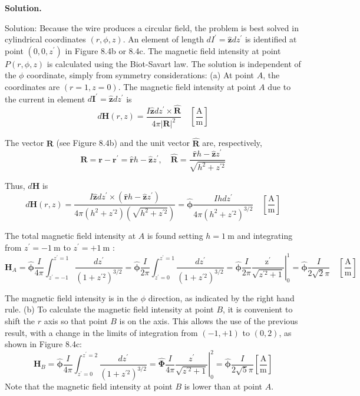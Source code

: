 \documentclass[12pt, a4paper, oneside]{report}
\newenvironment{solution}{
  \par\medskip\noindent
  \textbf{Solution.}\quad\itshape
  \par\noindent\makebox[\linewidth]{\rule{\textwidth}{0.4pt}}
}{
  \par\noindent\makebox[\linewidth]{\rule{\textwidth}{0.4pt}}
  \par\medskip
}
\begin{document}
\begin{solution}
Solution: Because the wire produces a circular field, the problem is best solved in cylindrical coordinates $(r, \phi, z)$. An element of length $d I^{\prime}=\hat{\mathbf{z}} d z^{\prime}$ is identified at point $\left(0,0, z^{\prime}\right)$ in Figure 8.4b or 8.4c. The magnetic field intensity at point $P(r, \phi, z)$ is calculated using the Biot-Savart law. The solution is independent of the $\phi$ coordinate, simply from symmetry considerations:
(a) At point $A$, the coordinates are $(r=1, z=0)$. The magnetic field intensity at point $A$ due to the current in element $d \mathbf{I}^{\prime}=\hat{\mathbf{z}} d z^{\prime}$ is
$$
d \mathbf{H}(r, z)=\frac{I \hat{\mathbf{z}} d z^{\prime} \times \hat{\mathbf{R}}}{4 \pi|\mathbf{R}|^2} \quad\left[\frac{\mathrm{A}}{\mathrm{m}}\right]
$$

The vector $\mathbf{R}$ (see Figure 8.4b) and the unit vector $\hat{\mathbf{R}}$ are, respectively,
$$
\mathbf{R}=\mathbf{r}-\mathbf{r}^{\prime}=\hat{\mathbf{r}} h-\hat{\mathbf{z}} z^{\prime}, \quad \hat{\mathbf{R}}=\frac{\hat{\mathbf{r}} h-\hat{\mathbf{z}} z^{\prime}}{\sqrt{h^2+z^{\prime 2}}}
$$

Thus, $d \mathbf{H}$ is
$$
d \mathbf{H}(r, z)=\frac{I \hat{\mathbf{z}} d z^{\prime} \times\left(\hat{\mathbf{r}} h-\hat{\mathbf{z}} z^{\prime}\right)}{4 \pi\left(h^2+z^{\prime 2}\right)\left(\sqrt{h^2+z^{\prime 2}}\right)}=\hat{\boldsymbol{\phi}} \frac{I h d z^{\prime}}{4 \pi\left(h^2+z^{\prime 2}\right)^{3 / 2}} \quad\left[\frac{\mathrm{A}}{\mathrm{m}}\right]
$$

The total magnetic field intensity at $A$ is found setting $h=1 \mathrm{~m}$ and integrating from $z^{\prime}=-1 \mathrm{~m}$ to $z^{\prime}=+1 \mathrm{~m}$ :
$$
\mathbf{H}_A=\hat{\boldsymbol{\phi}} \frac{I}{4 \pi} \int_{z^{\prime}=-1}^{z^{\prime}=1} \frac{d z^{\prime}}{\left(1+z^{\prime 2}\right)^{3 / 2}}=\hat{\boldsymbol{\phi}} \frac{I}{2 \pi} \int_{z^{\prime}=0}^{z^{\prime}=1} \frac{d z^{\prime}}{\left(1+z^{\prime 2}\right)^{3 / 2}}=\left.\hat{\boldsymbol{\phi}} \frac{I}{2 \pi} \frac{\mathrm{z}^{\prime}}{\sqrt{z^{\prime 2}+1}}\right|_0 ^1=\hat{\boldsymbol{\phi}} \frac{I}{2 \sqrt{2} \pi} \quad\left[\frac{\mathrm{A}}{\mathrm{m}}\right]
$$

The magnetic field intensity is in the $\phi$ direction, as indicated by the right hand rule.
(b) To calculate the magnetic field intensity at point $B$, it is convenient to shift the $r$ axis so that point $B$ is on the axis. This allows the use of the previous result, with a change in the limits of integration from $(-1,+1)$ to $(0,2)$, as shown in Figure 8.4c:
$$
\mathbf{H}_B=\hat{\boldsymbol{\phi}} \frac{I}{4 \pi} \int_{z^{\prime}=0}^{z^{\prime}=2} \frac{d z^{\prime}}{\left(1+z^{\prime 2}\right)^{3 / 2}}=\left.\hat{\boldsymbol{\Phi}} \frac{I}{4 \pi} \frac{z^{\prime}}{\sqrt{z^{\prime 2}+1}}\right|_0 ^2=\hat{\boldsymbol{\phi}} \frac{I}{2 \sqrt{5} \pi}\left[\frac{\mathrm{A}}{\mathrm{m}}\right]
$$
Note that the magnetic field intensity at point $B$ is lower than at point $A$.


\end{solution}
\end{document}
